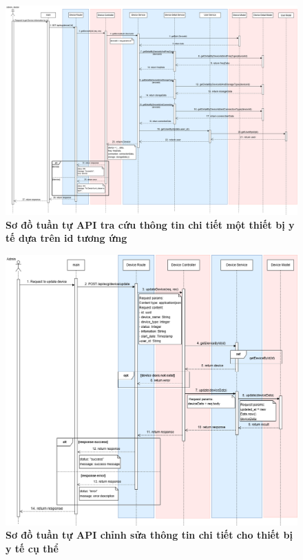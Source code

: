 \begin{figure}[H]
	\centering
	\includegraphics[width=16cm]{Images/api_sequence/device/device-GetDeviceById.drawio.png}
	\caption[Sơ đồ tuần tự API tra cứu thông tin chi tiết một thiết bị y tế dựa trên id tương ứng]{\bfseries \fontsize{12pt}{0pt}\selectfont Sơ đồ tuần tự API tra cứu thông tin chi tiết một thiết bị y tế dựa trên id tương ứng}
	\label{sequence_diagram_add_device}
\end{figure}

\begin{figure}[H]
	\centering
	\includegraphics[width=16cm]{Images/api_sequence/device/device-updateDevice.drawio.png}
	\caption[ Sơ đồ tuần tự API chỉnh sửa thông tin chi tiết cho thiết bị y tế cụ thể]{\bfseries \fontsize{12pt}{0pt}\selectfont  Sơ đồ tuần tự API chỉnh sửa thông tin chi tiết cho thiết bị y tế cụ thể}
	\label{sequence_diagram_update_device}
\end{figure}

